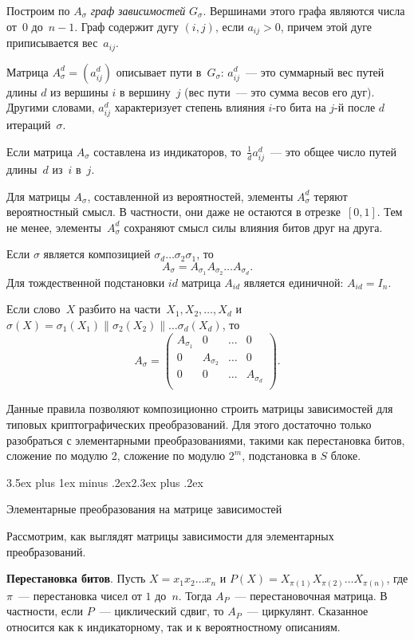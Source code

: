 \documentclass[a4paper,12pt]{report}
\makeatletter
\theoremstyle{plain} %
\theoremstyle{definition}
\theoremstyle{remark}
\renewcommand{\section}{\@startsection{section}{1}{18pt}%
{3.5ex plus 1ex minus .2ex}{2.3ex plus .2ex}%
{\normalfont\Large\bfseries\raggedright}}%
\makeatother
\begin{document}
\begin{large}
Построим по $A_\sigma$ {\it граф зависимостей} $G_\sigma$.
Вершинами этого графа являются числа от~$0$ до~$n-1$.
Граф содержит дугу $(i,j)$, если $a_{ij}>0$,
причем этой дуге приписывается вес~$a_{ij}$.

Матрица $A_\sigma^d=(a_{ij}^d)$ описывает пути в~$G_\sigma$:
$a_{ij}^d$~--- это суммарный вес путей длины $d$ из вершины $i$
в вершину~$j$ (вес пути~--- это сумма весов его дуг).
Другими словами, $a_{ij}^d$ характеризует степень влияния 
$i$-го бита на $j$-й после $d$ итераций~$\sigma$.

Если матрица $A_\sigma$ составлена из индикаторов,
то~$\frac{1}{d}a_{ij}^d$~--- это общее число путей длины~$d$
из~$i$ в~$j$.

Для матрицы $A_\sigma$, составленной из вероятностей,
элементы $A_\sigma^d$ теряют вероятностный смысл.
В частности, они даже не остаются в отрезке~$[0,1]$.
%
Тем не менее, элементы~$A_\sigma^d$ сохраняют смысл силы 
влияния битов друг на друга.

Если $\sigma$ является композицией $\sigma_d\ldots\sigma_2\sigma_1$,
то
$$
A_\sigma=A_{\sigma_1}A_{\sigma_2}\ldots A_{\sigma_d}.
$$
Для тождественной подстановки $id$ матрица $A_{id}$
является единичной: $A_{id}=I_n$.

Если слово~$X$ разбито на части~$X_1,X_2,\ldots,X_d$ 
и~$\sigma(X)=\sigma_1(X_1)\parallel\sigma_2(X_2)\parallel\ldots\sigma_d(X_d)$,
то
$$
A_\sigma=
\begin{pmatrix}
A_{\sigma_1} & 0 & \ldots & 0\\
0 & A_{\sigma_2} & \ldots & 0\\
0 &   0          & \ldots & A_{\sigma_d}\\
\end{pmatrix}.
$$

Данные правила позволяют композиционно строить матрицы 
зависимостей для типовых криптографических преобразований.
Для этого достаточно только разобраться с элементарными преобразованиями, такими как перестановка битов, сложение по модулю 2, сложение по модулю $2^m$, подстановка в $S$ блоке.

\section{Элементарные преобразования на матрице зависимостей}

Рассмотрим, как выглядят матрицы зависимости для элементарных преобразований.


{\bf Перестановка битов}.
Пусть $X=x_1x_2\ldots x_n$
и $P(X)=X_{\pi(1)}X_{\pi(2)}\ldots X_{\pi(n)}$,
где $\pi$~--- перестановка чисел от $1$ до~$n$.
Тогда $A_P$~--- перестановочная матрица.
В частности, если $P$~--- циклический сдвиг,
то $A_P$~--- циркулянт. Сказанное относится
как к индикаторному, так и к вероятностному описаниям.


\end{large}
\end{document}
